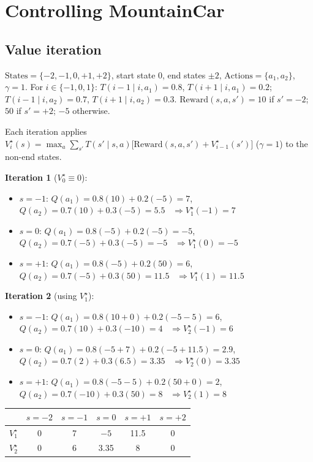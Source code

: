 \section{Controlling MountainCar}
\label{sec:mountaincar}

\subsection{Value iteration}

$\text{States}=\{-2,-1,0,+1,+2\}$, start state $0$, end states $\pm2$, $\text{Actions}=\{a_1,a_2\}$, $\gamma=1$.
For $i\in\{-1,0,1\}$: $T(i-1\mid i,a_1)=0.8$, $T(i+1\mid i,a_1)=0.2$; $T(i-1\mid i,a_2)=0.7$, $T(i+1\mid i,a_2)=0.3$.
$\text{Reward}(s,a,s')=10$ if $s'=-2$; $50$ if $s'=+2$; $-5$ otherwise.

\begin{solution}
Each iteration applies $V^\star_i(s)=\max_a\sum_{s'}T(s'\mid s,a)\bigl[\text{Reward}(s,a,s')+V^\star_{i-1}(s')\bigr]$
($\gamma=1$) to the non-end states.

\textbf{Iteration 1} ($V^\star_0\equiv0$):
\begin{itemize}[nosep]
  \item $s=-1$: $Q(a_1)=0.8(10)+0.2(-5)=7$, \ $Q(a_2)=0.7(10)+0.3(-5)=5.5$ \ $\Rightarrow V^\star_1(-1)=7$
  \item $s=0$: $Q(a_1)=0.8(-5)+0.2(-5)=-5$, \ $Q(a_2)=0.7(-5)+0.3(-5)=-5$ \ $\Rightarrow V^\star_1(0)=-5$
  \item $s=+1$: $Q(a_1)=0.8(-5)+0.2(50)=6$, \ $Q(a_2)=0.7(-5)+0.3(50)=11.5$ \ $\Rightarrow V^\star_1(1)=11.5$
\end{itemize}
\textbf{Iteration 2} (using $V^\star_1$):
\begin{itemize}[nosep]
  \item $s=-1$: $Q(a_1)=0.8(10+0)+0.2(-5-5)=6$, \ $Q(a_2)=0.7(10)+0.3(-10)=4$ \ $\Rightarrow V^\star_2(-1)=6$
  \item $s=0$: $Q(a_1)=0.8(-5+7)+0.2(-5+11.5)=2.9$, \ $Q(a_2)=0.7(2)+0.3(6.5)=3.35$ \ $\Rightarrow V^\star_2(0)=3.35$
  \item $s=+1$: $Q(a_1)=0.8(-5-5)+0.2(50+0)=2$, \ $Q(a_2)=0.7(-10)+0.3(50)=8$ \ $\Rightarrow V^\star_2(1)=8$
\end{itemize}
\begin{center}
\begin{tabular}{lccccc}
\toprule
 & $s=-2$ & $s=-1$ & $s=0$ & $s=+1$ & $s=+2$\\
\midrule
$V^\star_1$ & 0 & 7 & $-5$ & 11.5 & 0\\
$V^\star_2$ & 0 & 6 & 3.35 & 8 & 0\\
\bottomrule
\end{tabular}
\end{center}
\end{solution}

